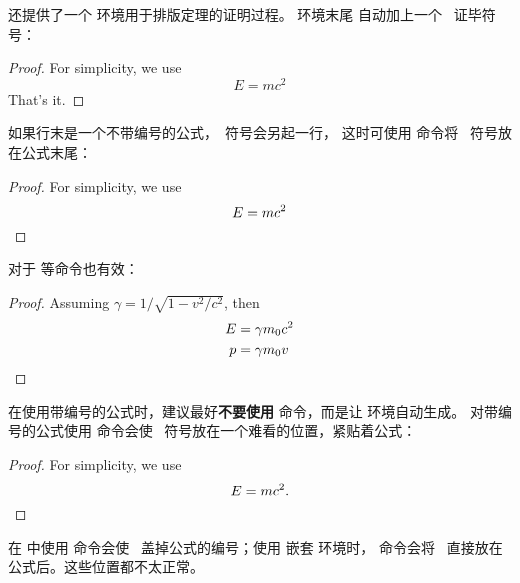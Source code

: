  还提供了一个  环境用于排版定理的证明过程。 环境末尾
自动加上一个 \qedsymbol\ 证毕符号：
\begin{example}
\begin{proof}
For simplicity, we use
\[
E=mc^2
\]
That's it.
\end{proof}
\end{example}

如果行末是一个不带编号的公式，\qedsymbol\ 符号会另起一行，
这时可使用  命令将 \qedsymbol\ 符号放在公式末尾：
\begin{example}
\begin{proof}
For simplicity, we use
\[
E=mc^2 \qedhere
\]
\end{proof}
\end{example}

 对于  等命令也有效：
\begin{example}
\begin{proof}
Assuming $\gamma 
= 1/\sqrt{1-v^2/c^2}$, then
\begin{align*}
E &= \gamma m_0 c^2  \\
p &= \gamma m_0v \qedhere
\end{align*}
\end{proof}
\end{example}

在使用带编号的公式时，建议最好\textbf{不要使用}  命令，而是让  环境自动生成。
对带编号的公式使用  命令会使 \qedsymbol\ 符号放在一个难看的位置，紧贴着公式：
\begin{example}
\begin{proof}
For simplicity, we use
\begin{equation}
E=mc^2.\qedhere
\end{equation}
\end{proof}
\end{example}

在  中使用  命令会使 \qedsymbol\ 盖掉公式的编号；使用  嵌套  环境时，
 命令会将 \qedsymbol\ 直接放在公式后。这些位置都不太正常。

\endinput